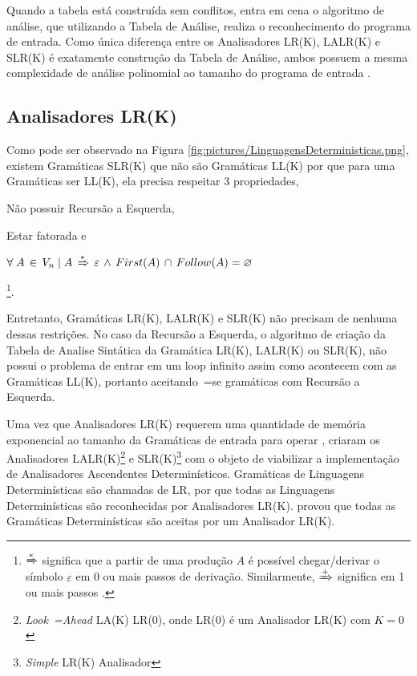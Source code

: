 {    Quando a tabela está construída sem conflitos,
    entra em cena o algoritmo de análise,
    que utilizando a Tabela de Análise,
    realiza o reconhecimento do programa de entrada.
    Como única diferença entre os Analisadores LR(K),
    LALR(K) e
    SLR(K) é exatamente construção da Tabela de Análise,
    ambos possuem a mesma complexidade de análise polinomial ao tamanho do programa de entrada \cite{linearLL1AndLR1Grammars,generalContextFreeParsingAlgorithm}.


\subsection{Analisadores LR(K)}

    Como pode ser observado na Figura \ref{fig:pictures/LinguagensDeterministicas.png},
    existem Gramáticas SLR(K) que não são Gramáticas LL(K) por que para uma Gramáticas ser LL(K),
    ela precisa respeitar 3 propriedades,
    \begin{inparaenum}
        \item Não possuir Recursão a Esquerda,
        \item Estar fatorada e
        \item $\forall\; A\, \in\, V_n\; |\; A\,
                \xRightarrow{*}\, \varepsilon\,
                \land\, First(A)\, \cap\, Follow(A) = \varnothing$
    \end{inparaenum}
    \cite{ahoCompilerDragonBook}\footnote{$\xRightarrow{*}$ significa que
    a partir de uma produção $A$ é possível chegar\slash{}derivar o
    símbolo $\varepsilon$ em 0 ou mais passos de derivação.
    Similarmente,
    $\xRightarrow{+}$ significa em 1 ou mais passos \cite{contextSensitiveParsing}.}.

    Entretanto,
    Gramáticas LR(K), LALR(K) e
    SLR(K) não precisam de nenhuma dessas restrições.
    No caso da Recursão a Esquerda,
    o algoritmo de criação da Tabela de Analise Sintática da Gramática LR(K),
    LALR(K) ou SLR(K),
    não possui o problema de entrar em um loop infinito assim como acontecem com as Gramáticas LL(K),
    portanto aceitando~=se gramáticas com Recursão a Esquerda.

    Uma vez que Analisadores LR(K) requerem uma quantidade de memória exponencial ao tamanho da Gramáticas de entrada para operar \cite{complexityOfLRKTesting},
     criaram os Analisadores LALR(K)\footnote{\textit{Look~=Ahead} LA(K) LR(0),
    onde LR(0) é um Analisador LR(K) com $K=0$
    } e
    SLR(K)\footnote{\textit{Simple} LR(K) Analisador} com o objeto de viabilizar a implementação de Analisadores Ascendentes Determinísticos.
    Gramáticas de Linguagens Determinísticas são chamadas de LR,
    por que todas as Linguagens Determinísticas são reconhecidas por Analisadores LR(K).
     provou que todas as Gramáticas Determinísticas são aceitas por um Analisador LR(K).

}
